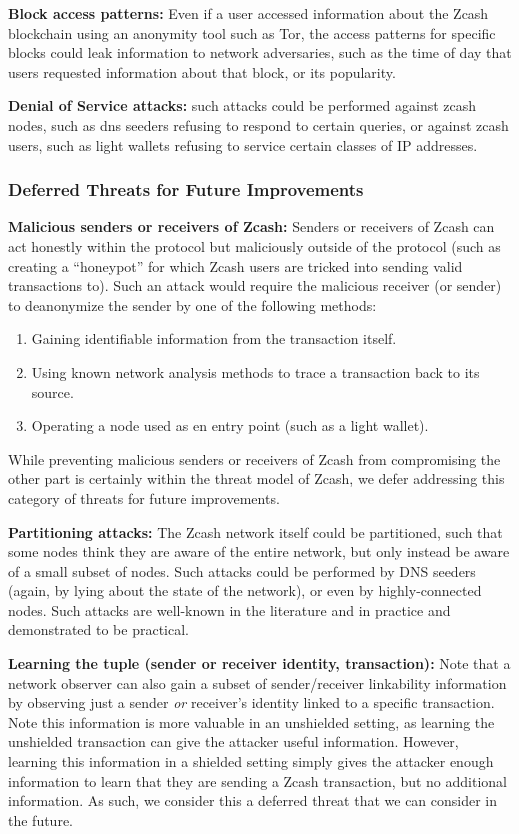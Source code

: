 \documentclass{article}
\begin{document}
\textbf{Block access patterns:} Even if a user accessed
information about the Zcash blockchain using an anonymity tool such as Tor, the
access patterns for specific blocks could leak information to network
adversaries, such as the time of day that users requested information about
that block, or its popularity.

\textbf{Denial of Service attacks:} such attacks could be performed against
zcash nodes, such as dns seeders refusing to respond to certain queries, or
against zcash users, such as light wallets refusing to service certain classes
of IP addresses.


\subsubsection{Deferred Threats for Future Improvements}

\textbf{Malicious senders or receivers of Zcash:}
Senders or receivers of Zcash can act honestly within the protocol but
maliciously outside of the protocol (such as creating a ``honeypot'' for which
Zcash users are tricked into sending valid transactions to). Such an attack
would require the malicious receiver (or sender) to deanonymize the sender by
one of the following methods:

\begin{enumerate}
  \item Gaining identifiable information from the transaction itself.
  \item Using known network analysis methods to trace a transaction back to its
    source.
  \item Operating a node used as en entry point (such as a light wallet).
\end{enumerate}


While preventing malicious
senders or receivers of Zcash from compromising the other part is certainly
within the threat model of Zcash, we defer addressing this category of threats
for future improvements.

\textbf{Partitioning attacks:} The Zcash network itself could be partitioned,
such that some nodes think they are aware of the entire network, but only
instead be aware of a small subset of nodes. Such attacks could be performed by
DNS seeders (again, by lying about the state of the network), or even by
highly-connected nodes. Such attacks are well-known in the literature and in
practice and demonstrated to be practical.

\textbf{Learning the tuple (sender or receiver identity, transaction):}
Note that a network observer can also gain a subset of sender/receiver
linkability information by
observing just a sender \emph{or} receiver's identity linked to a specific
transaction. Note this information is more valuable in an unshielded setting,
as learning the unshielded transaction can give the attacker useful
information. However, learning this information in a shielded setting simply
gives the attacker enough information to learn that they are sending a Zcash
transaction, but no additional information. As such, we consider this a
deferred threat that we can consider in the future.
\end{document}
